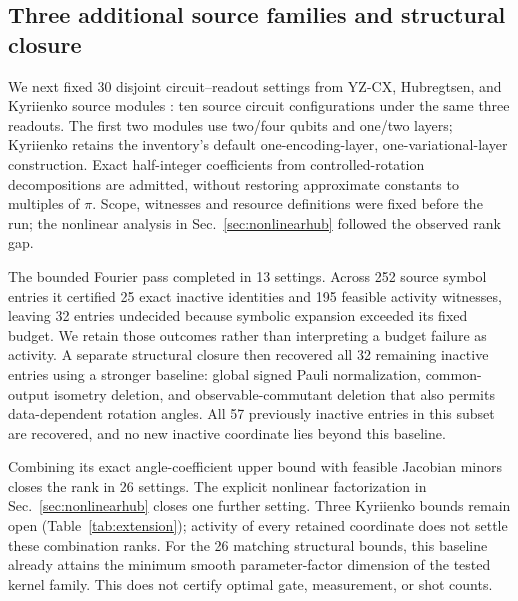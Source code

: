 \subsection{Three additional source families and structural closure}
\label{sec:extension}
We next fixed 30 disjoint circuit--readout settings from YZ-CX,
Hubregtsen, and Kyriienko source modules
\cite{squlearn,hubregtsen2022,kyriienko2021}: ten source circuit
configurations under the same three readouts. The first two modules
use two/four qubits and one/two layers; Kyriienko retains the inventory's
default one-encoding-layer, one-variational-layer construction.
Exact half-integer coefficients from controlled-rotation decompositions
are admitted, without restoring approximate constants to multiples of
$\pi$. Scope, witnesses and resource definitions were fixed before the
run; the nonlinear analysis in Sec.~\ref{sec:nonlinearhub} followed
the observed rank gap.

The bounded Fourier pass completed in 13 settings. Across 252 source
symbol entries it certified 25 exact inactive identities and 195
feasible activity witnesses, leaving 32 entries undecided because
symbolic expansion exceeded its fixed budget. We retain those outcomes
rather than interpreting a budget failure as activity. A separate
structural closure then recovered all 32 remaining inactive entries
using a stronger baseline: global signed Pauli normalization,
common-output isometry deletion, and observable-commutant deletion
that also permits data-dependent rotation angles. All 57 previously
inactive entries in this subset are recovered, and no new inactive
coordinate lies beyond this baseline.

Combining its exact angle-coefficient upper bound with feasible
Jacobian minors closes the rank in 26 settings. The explicit nonlinear
factorization in Sec.~\ref{sec:nonlinearhub} closes one further setting.
Three Kyriienko bounds remain open (Table~\ref{tab:extension}); activity
of every retained coordinate does not settle these combination ranks.
For the 26 matching structural bounds, this baseline already attains
the minimum smooth parameter-factor dimension of the tested kernel
family. This does not certify optimal gate, measurement, or shot counts.

